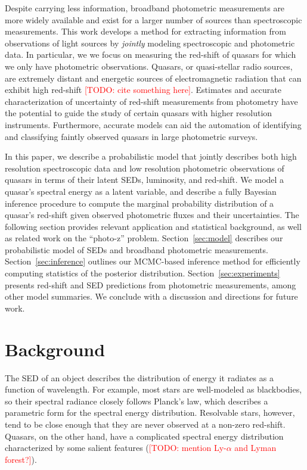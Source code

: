 \documentclass{article}
\newcommand{\red}[1]{\textcolor{red}{[TODO: #1]}}
\begin{document}
Despite carrying less information, broadband photometric measurements are more widely available and exist for a larger number of sources than spectroscopic measurements. 
This work develops a method for extracting information from observations of light sources by \emph{jointly} modeling spectroscopic and photometric data.  
In particular, we we focus on measuring the red-shift of quasars for which we only have photometric observations.  
Quasars, or quasi-stellar radio sources, are extremely distant and energetic sources of electromagnetic radiation that can exhibit high red-shift \red{cite something here}.  
Estimates and accurate characterization of uncertainty of red-shift measurements from photometry have the potential to guide the study of certain quasars with higher resolution instruments.  
Furthermore, accurate models can aid the automation of identifying and classifying faintly observed quasars in large photometric surveys.  

In this paper, we describe a probabilistic model that jointly describes both high resolution spectroscopic data and low resolution photometric observations of quasars in terms of their latent SEDs, luminosity, and red-shift.  We model a quasar's spectral energy as a latent variable, and describe a fully Bayesian inference procedure to compute the marginal probability distribution of a quasar's red-shift given observed photometric fluxes and their uncertainties.  The following section provides relevant application and statistical background, as well as related work on the ``photo-z'' problem.  Section~\ref{sec:model} describes our probabilistic model of SEDs and broadband photometric measurements.  Section~\ref{sec:inference} outlines our MCMC-based inference method for efficiently computing statistics of the posterior distribution. Section~\ref{sec:experiments} presents red-shift and SED predictions from photometric measurements, among other model summaries.  We conclude with a discussion and directions for future work.  
  

\section{Background}
\label{sec:background}
The SED of an object describes the distribution of energy it radiates as a function of wavelength.  
For example, most stars are well-modeled as blackbodies, so their spectral radiance closely follows Planck's law, which describes a parametric form for the spectral energy distribution.  Resolvable stars, however, tend to be close enough that they are never observed at a non-zero red-shift. 
Quasars, on the other hand, have a complicated spectral energy distribution characterized by some salient features (\red{mention Ly-$\alpha$ and Lyman forest?}).  
\end{document}
